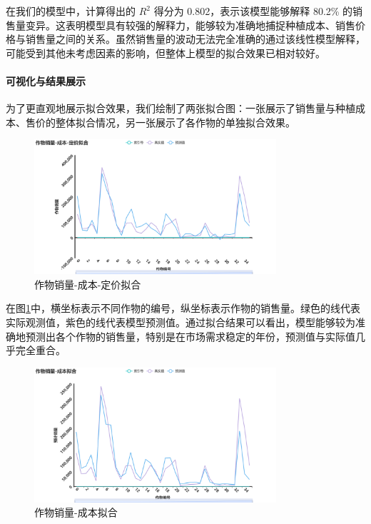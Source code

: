 \documentclass[12pt,a4paper]{nmmcm}
\begin{document}
在我们的模型中，计算得出的 $R^2$ 得分为 0.802，表示该模型能够解释 80.2\% 的销售量变异。这表明模型具有较强的解释力，能够较为准确地捕捉种植成本、销售价格与销售量之间的关系。虽然销售量的波动无法完全准确的通过该线性模型解释，可能受到其他未考虑因素的影响，但整体上模型的拟合效果已相对较好。

\paragraph{可视化与结果展示}

为了更直观地展示拟合效果，我们绘制了两张拟合图：一张展示了销售量与种植成本、售价的整体拟合情况，另一张展示了各作物的单独拟合效果。

\begin{figure}[H]
  \centering
  \includegraphics[width=0.8\textwidth]{figures/prob3/correlation/作物销量-成本-定价拟合.png}
  \caption{作物销量-成本-定价拟合}
  \label{fig:fitting1}
\end{figure}

在图\ref{fig:fitting1}中，横坐标表示不同作物的编号，纵坐标表示作物的销售量。绿色的线代表实际观测值，紫色的线代表模型预测值。通过拟合结果可以看出，模型能够较为准确地预测出各个作物的销售量，特别是在市场需求稳定的年份，预测值与实际值几乎完全重合。

\begin{figure}[H]
  \centering
  \includegraphics[width=0.8\textwidth]{figures/prob3/correlation/作物销量-成本拟合.png}
  \caption{作物销量-成本拟合}
  \label{fig:fitting2}
\end{figure}
\end{document}
